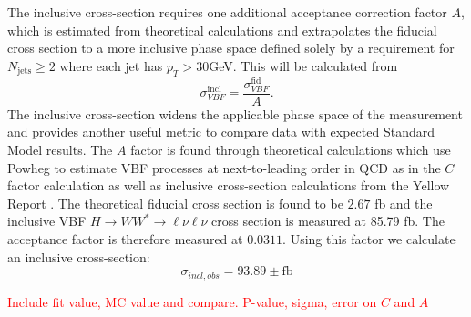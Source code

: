 The inclusive cross-section requires one additional acceptance correction factor $A$, which is estimated from theoretical calculations and extrapolates the fiducial cross section to a more inclusive phase space defined solely by a requirement for $N_{\text{jets}}\geq2$ where each jet has $p_T>30$GeV. This will be calculated from
\begin{equation}
\sigma_{VBF}^{\text{incl}} = \frac{\sigma_{VBF}^{\text{fid}}}{A}.
\end{equation}
The inclusive cross-section widens the applicable phase space of the measurement and provides another useful metric to compare data with expected Standard Model results. The $A$ factor is found through theoretical calculations which use Powheg to estimate VBF processes at next-to-leading order in QCD as in the $C$ factor calculation as well as inclusive cross-section calculations from the Yellow Report \cite{YellowReport}. The theoretical fiducial cross section is found to be $2.67$ fb and the inclusive VBF $H\rightarrow WW^*\rightarrow \ell\nu\ell\nu$ cross section is measured at 85.79 fb. The acceptance factor is therefore measured at $0.0311$. Using this factor we calculate an inclusive cross-section:
\begin{equation}
\sigma_{incl,obs} = 93.89 \pm \text{fb}
\end{equation} 

\textcolor{red}{Include fit value, MC value and compare. P-value, sigma, error on $C$ and $A$}

